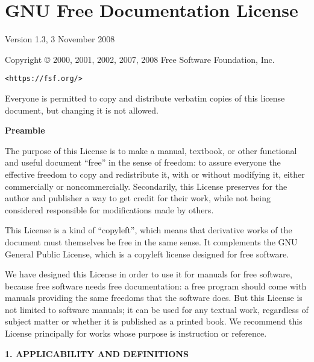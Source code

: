 \chapter*{GNU Free Documentation License} 
\pagestyle{plain}

\begin{center}
  Version 1.3, 3 November 2008

  Copyright \copyright{} 2000, 2001, 2002, 2007, 2008 Free Software
  Foundation, Inc.
  
  \bigskip
  
  \texttt{<https://fsf.org/>}
  
  \bigskip
  
  Everyone is permitted to copy and distribute verbatim copies of this license
  document, but changing it is not allowed.
\end{center}

\begin{center}
  {\bf\large Preamble}
\end{center}

The purpose of this License is to make a manual, textbook, or other functional
and useful document ``free'' in the sense of freedom: to assure everyone the
effective freedom to copy and redistribute it, with or without modifying it,
either commercially or noncommercially. Secondarily, this License preserves for
the author and publisher a way to get credit for their work, while not being
considered responsible for modifications made by others.

This License is a kind of ``copyleft'', which means that derivative works of the
document must themselves be free in the same sense. It complements the GNU
General Public License, which is a copyleft license designed for free software.

We have designed this License in order to use it for manuals for free software,
because free software needs free documentation: a free program should come with
manuals providing the same freedoms that the software does. But this License is
not limited to software manuals; it can be used for any textual work, regardless
of subject matter or whether it is published as a printed book. We recommend
this License principally for works whose purpose is instruction or reference.


\begin{center}
  {\Large\bf 1. APPLICABILITY AND DEFINITIONS\par} 
\end{center}

